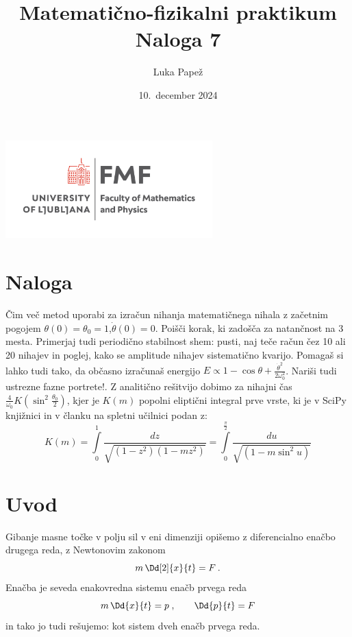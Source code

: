 \documentclass{article}
\begin{document}
\title{Matematično-fizikalni praktikum \\[3mm] \large Naloga 7}
\author{Luka Papež}
\date{10.\ december 2024}

\begin{center}
    \includegraphics[width=8cm]{logo-fmf.png}
\end{center}

{
    \let\newpage\relax
    \maketitle
}

\maketitle
\newpage
\section{Naloga}
Čim več metod uporabi za izračun
nihanja matematičnega nihala z začetnim pogojem  $\theta(0)= \theta_0 = 1$,$\dot{\theta}(0)=0$. 
Poišči korak, ki zadošča za natančnost na 3 mesta. Primerjaj
tudi periodično stabilnost shem: pusti, naj teče račun čez 10
ali 20 nihajev in poglej, kako se amplitude nihajev sistematično
kvarijo. Pomagaš si lahko tudi tako, da občasno izračunaš
energijo $E \propto  1-\cos \theta + \frac{\dot{\theta}^2 }{2 \omega_0^2} $. Nariši tudi
ustrezne fazne portrete!.
Z analitično rešitvijo dobimo za nihajni čas $\frac{4}{\omega_0} K\left(\sin^2\frac{\theta_0}{2}\right)$, kjer je $K(m)$ popolni
eliptični integral prve vrste, ki je v SciPy knjižnici in v članku na spletni učilnici podan z:
\[
K(m)=\int\limits_{0}^{1} \frac{d z}{\sqrt{\left(1-z^{2}\right)\left(1-m z^{2}\right)}} = \int\limits_{0}^{\frac{\pi}{2}} \frac{d u}{\sqrt{\left(1-m \sin^2{u}\right)}}
\] 
\section{Uvod}
Gibanje masne točke v polju sil v eni dimenziji opišemo
z diferencialno enačbo drugega reda, z Newtonovim zakonom
\begin{equation*}
m\, \Dd[2]{x}{t} = F \>.
\end{equation*}
Enačba je seveda enakovredna sistemu enačb prvega reda
\[
m\, \Dd{x}{t} = p \;, \qquad \Dd{p}{t} = F
\]
in tako jo tudi rešujemo: kot sistem dveh enačb prvega reda.
\end{document}
